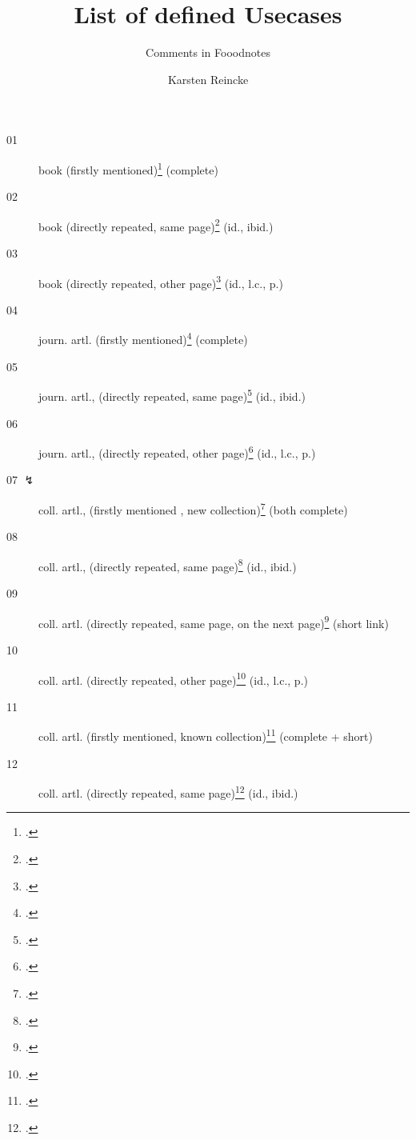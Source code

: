 \documentclass[
  DIV=calc,
  BCOR=5mm,
  11pt,
  smallheadings,
  oneside,
  abstract=true,
  toc=bib]{scrartcl}
\begin{document}
\nocite{*}

\titlehead{mycsrf.verify-: English}
\subject{(scholar-) Scientific Texts Based on a Modified\textit{jurabib}}
\title{List of defined Usecases}
\subtitle{Comments in Fooodnotes}
\author{Karsten Reincke}

\maketitle


\begin{description}

  \item[01 \checkmark] book 
    (firstly  mentioned)\footcite[vgl.][12]{KantKdU1974} (complete) 
  \item[02 \checkmark] book (directly repeated,
      same page)\footcite[vgl.][12]{KantKdU1974} (id., ibid.)
  \item[03 \checkmark] book (directly repeated, 
      other page)\footcite[vgl.][13]{KantKdU1974} (id., l.c., p.)
  \item[04 \checkmark] journ. artl.
    (firstly  mentioned)\footcite[vgl.][12]{McCarthy1980a} (complete)
  \item[05 \checkmark] journ. artl., (directly repeated,
       same page)\footcite[vgl.][12]{McCarthy1980a} (id., ibid.)
  \item[06 \checkmark] journ. artl., (directly repeated,
       other page)\footcite[vgl.][13]{McCarthy1980a} (id., l.c., p.)
  
  \item[07 $\lightning$] coll. artl., (firstly  mentioned , 
      new collection)\footcite[vgl.][12]{Hays1985a} (both complete)
  \item[08 \checkmark] coll. artl., (directly repeated,
      same page)\footcite[vgl.][12]{Hays1985a} (id., ibid.)
      
 \item[09 \checkmark] coll. artl. (directly repeated,
      same page, on the next page)\footcite[vgl.][12]{Hays1985a} (short link)
  \item[10 \checkmark]  coll. artl. (directly repeated,
      other page)\footcite[vgl.][13]{Hays1985a} (id., l.c., p.)
       
  \item[11 \checkmark] coll. artl. (firstly  mentioned,
      known collection)\footcite[vgl.][12]{DaBu1985a} (complete + short)
  \item[12 \checkmark] coll. artl. (directly repeated,
      same page)\footcite[vgl.][12]{DaBu1985a} (id., ibid.)


\end{description}
\end{document}
